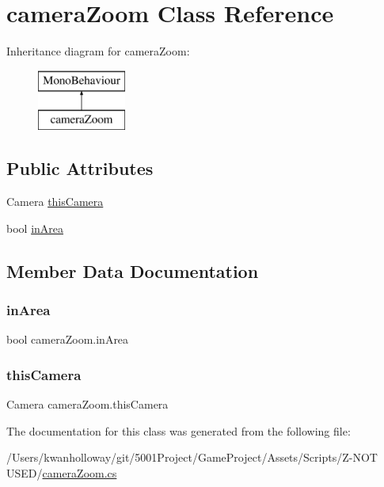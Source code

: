 \hypertarget{classcamera_zoom}{}\section{camera\+Zoom Class Reference}
\label{classcamera_zoom}
Inheritance diagram for camera\+Zoom\+:\begin{figure}[H]
\begin{center}
\leavevmode
\includegraphics[height=2.000000cm]{classcamera_zoom}
\end{center}
\end{figure}
\subsection*{Public Attributes}
\begin{DoxyCompactItemize}
\item 
Camera \hyperlink{classcamera_zoom_ac4110b23099c06c7c7d23a41200802bd}{this\+Camera}
\item 
bool \hyperlink{classcamera_zoom_a808d6a51143de0d2af012b993f972b0f}{in\+Area}
\end{DoxyCompactItemize}


\subsection{Member Data Documentation}
\mbox{\label{classcamera_zoom_a808d6a51143de0d2af012b993f972b0f}} 
\subsubsection{\texorpdfstring{in\+Area}{inArea}}
{\footnotesize\ttfamily bool camera\+Zoom.\+in\+Area}

\mbox{\label{classcamera_zoom_ac4110b23099c06c7c7d23a41200802bd}} 
\subsubsection{\texorpdfstring{this\+Camera}{thisCamera}}
{\footnotesize\ttfamily Camera camera\+Zoom.\+this\+Camera}



The documentation for this class was generated from the following file\+:\begin{DoxyCompactItemize}
\item 
/\+Users/kwanholloway/git/5001\+Project/\+Game\+Project/\+Assets/\+Scripts/\+Z-\/\+N\+O\+T U\+S\+E\+D/\hyperlink{camera_zoom_8cs}{camera\+Zoom.\+cs}\end{DoxyCompactItemize}
